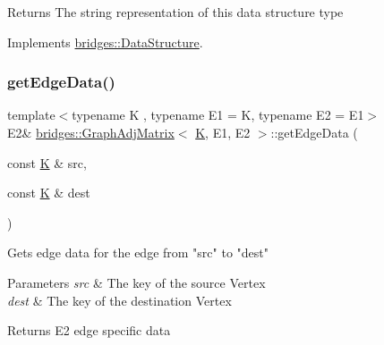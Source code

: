\begin{DoxyReturn}{Returns}
The string representation of this data structure type 
\end{DoxyReturn}


Implements \mbox{\hyperlink{classbridges_1_1_data_structure_a957a63b106e340bc753620c650632bdc}{bridges\+::\+Data\+Structure}}.

\mbox{\label{classbridges_1_1_graph_adj_matrix_abbbb63d19c803973b51aa4379731e177}} 
\subsubsection{\texorpdfstring{getEdgeData()}{getEdgeData()}}
{\footnotesize\ttfamily template$<$typename K , typename E1  = K, typename E2  = E1$>$ \\
E2\& \mbox{\hyperlink{classbridges_1_1_graph_adj_matrix}{bridges\+::\+Graph\+Adj\+Matrix}}$<$ \mbox{\hyperlink{namespacebridges_acfb0a4f7877d8f63de3e6862004c50edaa5f3c6a11b03839d46af9fb43c97c188}{K}}, E1, E2 $>$\+::get\+Edge\+Data (\begin{DoxyParamCaption}\item[{const \mbox{\hyperlink{namespacebridges_acfb0a4f7877d8f63de3e6862004c50edaa5f3c6a11b03839d46af9fb43c97c188}{K}} \&}]{src,  }\item[{const \mbox{\hyperlink{namespacebridges_acfb0a4f7877d8f63de3e6862004c50edaa5f3c6a11b03839d46af9fb43c97c188}{K}} \&}]{dest }\end{DoxyParamCaption})\hspace{0.3cm}{\ttfamily [inline]}}

\begin{DoxyVerb}Gets edge data for the edge from "src" to "dest"
\end{DoxyVerb}



\begin{DoxyParams}{Parameters}
{\em src} & The key of the source Vertex \\
\hline
{\em dest} & The key of the destination Vertex\\
\hline
\end{DoxyParams}
\begin{DoxyReturn}{Returns}
E2 edge specific data 
\end{DoxyReturn}
\mbox{\label{classbridges_1_1_graph_adj_matrix_a52652abff91b98257e17aea6f9560128}} 
